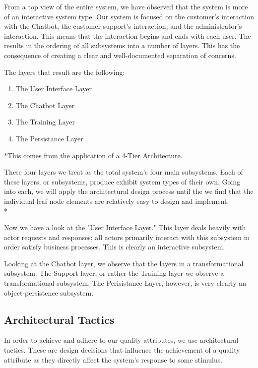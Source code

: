 \documentclass[11pt]{article}
\begin{document}
From a top view of the entire system, we have observed that the system is more of an interactive system type. Our system is focused on the customer's interaction with the Chatbot, the customer support's interaction, and the administrator's interaction. This means that the interaction begins and ends with each user. The results in the ordering of all subsystems into a number of layers. This has the consequence of creating a clear and well-documented separation of concerns\cite{Book:2}. 

The layers that result are the following:
\begin{enumerate}
	\item The User Interface Layer
	\item The Chatbot Layer
	\item The Training Layer
	\item The Persistance Layer
\end{enumerate}
*This comes from the application of a 4-Tier Architecture.

These four layers we treat as the total system's four main subsystems. Each of these layers, or subsystems, produce exhibit system types of their own. Going into each, we will apply the architectural design process until the we find that the individual leaf node elements are relatively easy to design and implement\cite{Book:1}. \\*

Now we have a look at the "User Interface Layer." This layer deals heavily with actor requests and responses; all actors primarily interact with this subsystem in order satisfy business processes. This is clearly an interactive subsystem.\par

Looking at the Chatbot layer, we observe that the layers in a transformational subsystem. The Support layer, or rather the Training layer we observe a transformational subsystem. The Perisistance Layer, however, is very clearly an object-persistence subsystem.

\subsection{Architectural Tactics}

In order to achieve and adhere to our quality attributes, we use architectural tactics. These are design decisions that influence the achievement of a quality attribute as they directly affect the system's response to some stimulus\cite{Book:2}.
\end{document}
